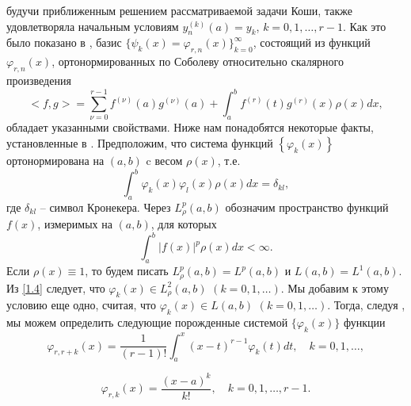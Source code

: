  будучи приближенным решением рассматриваемой задачи Коши, также удовлетворяла начальным условиям $y_n^{(k)}(a)=y_k$, $k=0,1,\ldots,r-1$. Как это было  показано в \cite{Shar20},  базис $\{\psi_k(x)= \varphi_{r,n}(x)\}_{k=0}^\infty$, состоящий из функций $\varphi_{r,n}(x)$, ортонормированных по Соболеву относительно скалярного произведения
\begin{equation}\label{1.3}
<f,g>=\sum_{\nu=0}^{r-1}f^{(\nu)}(a)g^{(\nu)}(a)+\int_{a}^{b}f^{(r)}(t)g^{(r)}(x)\rho(x)dx,
\end{equation}
 обладает указанными свойствами. Ниже нам понадобятся некоторые факты, установленные в \cite{Shar20}.  Предположим, что система функций  $\left\{\varphi_k(x)\right\}$ ортонормирована  на $(a,b)$  c весом   $\rho(x)$, т.е.
 \begin{equation}\label{1.4}
\int_a^b\varphi_k(x)\varphi_l(x)\rho(x)dx=\delta_{kl},
\end{equation}
где $\delta_{kl}$ -- символ Кронекера. Через $L^p_\rho(a,b)$ обозначим пространство  функций $f(x)$, измеримых  на  $(a,b)$, для которых
 \begin{equation*}
\int_a^b|f(x)|^p\rho(x)dx<\infty.
\end{equation*}
Если $\rho(x)\equiv1$, то будем писать $L^p_\rho(a,b)=L^p(a,b)$ и $L(a,b)=L^1(a,b)$.
Из \eqref{1.4} следует, что $\varphi_k(x)\in L^2_\rho(a,b)$ $(k=0,1,\ldots)$. Мы добавим к этому условию еще одно, считая, что $\varphi_k(x)\in L(a,b)$ $(k=0,1,\ldots)$. Тогда, следуя  \cite{Shar20}, мы можем определить следующие порожденные системой $\{\varphi_k(x)\}$ функции
 \begin{equation}\label{1.5}
\varphi_{r,r+k}(x) =\frac{1}{(r-1)!}\int_a^x(x-t)^{r-1}\varphi_{k}(t)dt, \quad k=0,1,\ldots,
\end{equation}

  \begin{equation}\label{1.6}
\varphi_{r,k}(x) =\frac{(x-a)^k}{k!}, \quad k=0,1,\ldots, r-1.
\end{equation}


